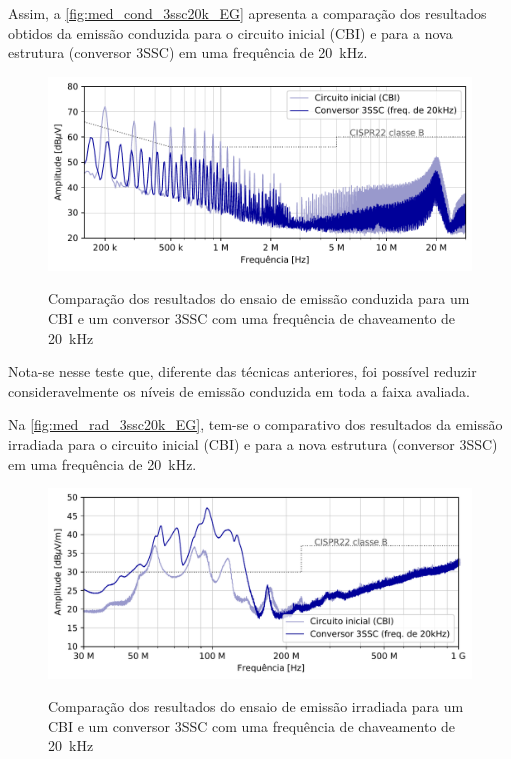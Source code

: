     Assim, a \autoref{fig:med_cond_3ssc20k_EG} apresenta a comparação dos resultados obtidos da emissão conduzida para o circuito inicial (CBI) e para a nova estrutura (conversor 3SSC) em uma frequência de \SI{20}{\kilo\hertz}.
    
    \begin{figure}[H]
    	\centering
    	\caption{Comparação dos resultados do ensaio de emissão conduzida para um CBI e um conversor 3SSC com uma frequência de chaveamento de \SI{20}{\kilo\hertz}}
    	\includegraphics[scale=.9]{pdf/cond/Conversor 3SSC (freq. de 20kHz).pdf}
    	\label{fig:med_cond_3ssc20k_EG}
    \end{figure}
    
    Nota-se nesse teste que, diferente das técnicas anteriores, foi possível reduzir consideravelmente os níveis de emissão conduzida em toda a faixa avaliada. 
    
    Na \autoref{fig:med_rad_3ssc20k_EG}, tem-se o comparativo dos resultados da emissão irradiada para o circuito inicial (CBI) e para a nova estrutura (conversor 3SSC) em uma frequência de \SI{20}{\kilo\hertz}.
    
    \begin{figure}[H]
    	\centering
    	\caption{Comparação dos resultados do ensaio de emissão irradiada para um CBI e um conversor 3SSC com uma frequência de chaveamento de \SI{20}{\kilo\hertz}}
    	\includegraphics[scale=.9]{pdf/rad/Conversor 3SSC (freq. de 20kHz).pdf}
    	\label{fig:med_rad_3ssc20k_EG}
    \end{figure}
    
